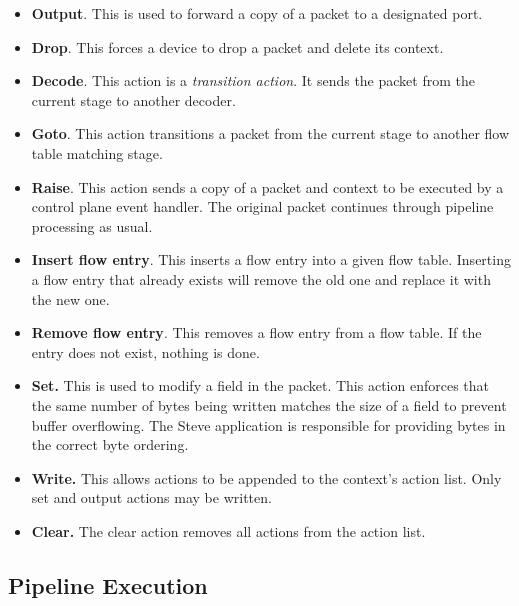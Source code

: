 \begin{itemize}

\item \textbf{Output}. This is used to forward a copy of a packet to a designated port.

\item \textbf{Drop}. This forces a device to drop a packet and delete its context.

\item \textbf{Decode}. This action is a \emph{transition action}. It sends the
packet from the current stage to another decoder.

\item \textbf{Goto}. This action transitions a packet from the current stage
to another flow table matching stage.

\item \textbf{Raise}. This action sends a copy of a packet and context to
be executed by a control plane event handler. 
The original packet continues through pipeline processing as usual.

\item \textbf{Insert flow entry}. This inserts a flow entry into
a given flow table.
Inserting a flow entry that already exists will
remove the old one and replace it with the new one. 

\item \textbf{Remove flow entry}. This removes a flow entry from a flow table.
If the entry does not exist, nothing is done.

\item \textbf{Set.} This is used to modify a field in the packet. This action enforces that the same number of bytes being written matches the size of a field to prevent buffer overflowing. The Steve application is responsible for providing bytes in the correct byte ordering.

\item \textbf{Write.} This allows actions to be appended to the context's
action list. Only set and output actions may be written.

\item \textbf{Clear.} The clear action removes all actions from the action list.

\end{itemize}

\subsection{Pipeline Execution}

